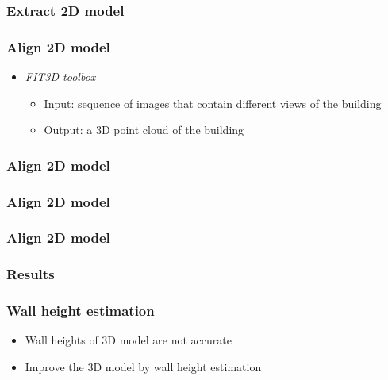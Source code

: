 \documentclass{beamer}
\begin{document}
\frame
{
	\frametitle{Extract 2D model}
}

\frame
{
	\frametitle{Align 2D model}
	\begin{itemize}
	\item <+-| alert@+> \emph{FIT3D toolbox}
		\begin{itemize}
		\item <+-| alert@+> Input: sequence of images that contain different views of the building
		\item <+-| alert@+> Output: a 3D point cloud of the building
		\end{itemize}
	\end{itemize}
}

\frame
{
}



\frame
{
	\frametitle{Align 2D model}
}


\frame
{
	\frametitle{Align 2D model}
}


\frame
{
	\frametitle{Align 2D model}
}

\frame
{
	\frametitle{Results}
}

\frame
{
	\frametitle{Wall height estimation}
	\begin{itemize}
	\item <+-| alert@+> Wall heights of 3D model are not accurate
	\item <+-| alert@+> Improve the 3D model by wall height estimation
	\end{itemize}
}
\end{document}

